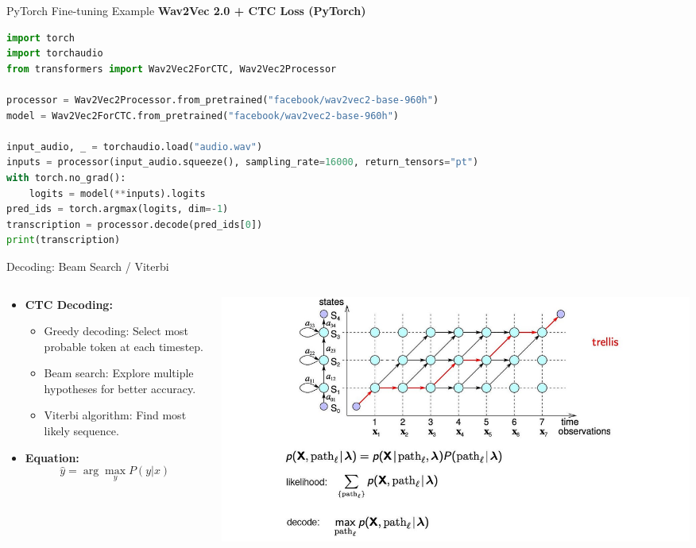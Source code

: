 \begin{frame}[fragile]{PyTorch Fine-tuning Example}
    \textbf{Wav2Vec 2.0 + CTC Loss (PyTorch)}
    \begin{lstlisting}[language=Python]
import torch
import torchaudio
from transformers import Wav2Vec2ForCTC, Wav2Vec2Processor

processor = Wav2Vec2Processor.from_pretrained("facebook/wav2vec2-base-960h")
model = Wav2Vec2ForCTC.from_pretrained("facebook/wav2vec2-base-960h")

input_audio, _ = torchaudio.load("audio.wav")
inputs = processor(input_audio.squeeze(), sampling_rate=16000, return_tensors="pt")
with torch.no_grad():
    logits = model(**inputs).logits
pred_ids = torch.argmax(logits, dim=-1)
transcription = processor.decode(pred_ids[0])
print(transcription)
    \end{lstlisting}
\end{frame}

\begin{frame}{Decoding: Beam Search / Viterbi}
    \begin{columns}[T,onlytextwidth]
        \begin{column}{0.4\textwidth}
            \begin{itemize}
                \item \textbf{CTC Decoding:}
                \begin{itemize}
                    \setlength{\itemsep}{1em}
                    \item Greedy decoding: Select most probable token at each timestep.
                    \item Beam search: Explore multiple hypotheses for better accuracy.
                    \item Viterbi algorithm: Find most likely sequence.
                \end{itemize}
                \item \textbf{Equation:}
                \[
                    \hat{y} = \arg\max_{y} P(y|x)
                \]
            \end{itemize}
        \end{column}
        \begin{column}{0.75\textwidth}
            \begin{center}
                \includegraphics[width=\textwidth]{images/audio-nlp/ctc-decoding.png}
            \end{center}
        \end{column}
    \end{columns}
\end{frame}